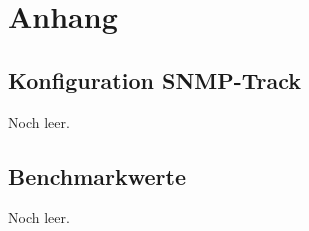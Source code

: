 \chapter{Anhang}


\section{Konfiguration SNMP-Track}
\label{cha:Anhang1}

Noch leer.

\section{Benchmarkwerte}
\label{cha:Anhang2}

Noch leer.